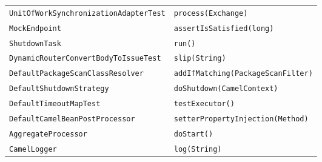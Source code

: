 \begin{center}
\begin{longtable}{ll}
\lstinline/UnitOfWorkSynchronizationAdapterTest/&{\lstinline/process(Exchange)/}\\
\lstinline/MockEndpoint/&{\lstinline/assertIsSatisfied(long)/}\\
\lstinline/ShutdownTask/&{\lstinline/run()/}\\
\lstinline/DynamicRouterConvertBodyToIssueTest/&{\lstinline/slip(String)/}\\
\lstinline/DefaultPackageScanClassResolver/&{\lstinline/addIfMatching(PackageScanFilter)/}\\
\lstinline/DefaultShutdownStrategy/&{\lstinline/doShutdown(CamelContext)/}\\
\lstinline/DefaultTimeoutMapTest/&{\lstinline/testExecutor()/}\\
\lstinline/DefaultCamelBeanPostProcessor/&{\hspace*{-2pt}\lstinline/setterPropertyInjection(Method)/}\\
\lstinline/AggregateProcessor/&{\lstinline/doStart()/}\\
\lstinline/CamelLogger/&{\lstinline/log(String)/}\\
\end{longtable}
\end{center}


